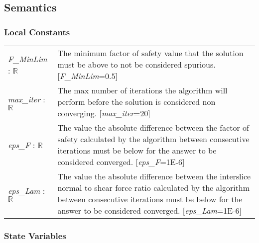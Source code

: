 \documentclass[12pt, titlepage]{article}
\begin{document}
\subsection{Semantics}

\subsubsection{Local Constants}
\renewcommand*{\arraystretch}{1.5}
\begin{longtable}{ p{}  p{}}
  \textit{F\_MinLim} : $\mathbb{R}$ & The minimum factor of safety
  value that the solution must be above to not be considered
  spurious. [\textit{F\_MinLim}=0.5]\\
  
  \textit{max\_iter} : $\mathbb{R}$ & The max number of iterations the
  algorithm will perform before the solution is considered non
  converging. [\textit{max\_iter}=20]\\

  \textit{eps\_F} : $\mathbb{R}$ & The value the absolute difference
  between the factor of safety calculated by the algorithm between
  consecutive iterations must be below for the answer to be considered
  converged. [\textit{eps\_F}=1E-6]\\

  \textit{eps\_Lam} : $\mathbb{R}$ & The value the absolute difference
  between the interslice normal to shear force ratio calculated by the
  algorithm between consecutive iterations must be below for the
  answer to be considered converged. [\textit{eps\_Lam}=1E-6]\\
\end{longtable}

\subsubsection{State Variables}
\end{document}
